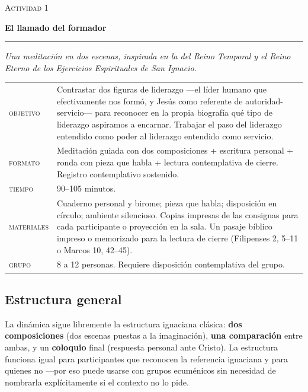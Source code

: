 \documentclass[11pt, a4paper]{article}
\newcommand{\etiqueta}[1]{\textcolor{liderazgoVino}{\scshape #1}}
\newcommand{\tituloActividad}[2]{%
  {\color{tenue}\scshape\normalsize Actividad #1}\par
  \vspace{0.15em}
  {\color{liderazgoVino}\LARGE\bfseries #2}\par
  \vspace{0.3em}
  {\color{regla}\rule{\linewidth}{0.4pt}}\par
  \vspace{0.5em}
}
\begin{document}
\begin{actividad}
\tituloActividad{1}{El llamado del formador}
{\color{tenue}\small\itshape Una meditación en dos escenas, inspirada en la del Reino Temporal y el Reino Eterno de los \emph{Ejercicios Espirituales} de San Ignacio.}

\vspace{0.8em}

\begin{ficha}
\begin{tabular}{@{}p{6em}@{\hspace{1em}}p{\dimexpr\linewidth-7.6em}@{}}
  \etiqueta{objetivo}   & Contrastar dos figuras de liderazgo ---el líder humano que efectivamente nos formó, y Jesús como referente de autoridad-servicio--- para reconocer en la propia biografía qué tipo de liderazgo aspiramos a encarnar. Trabajar el paso del liderazgo entendido como poder al liderazgo entendido como servicio. \\[0.35em]
  \etiqueta{formato}    & Meditación guiada con dos composiciones + escritura personal + ronda con pieza que habla + lectura contemplativa de cierre. Registro contemplativo sostenido. \\[0.35em]
  \etiqueta{tiempo}     & 90--105 minutos. \\[0.35em]
  \etiqueta{materiales} & Cuaderno personal y birome; pieza que habla; disposición en círculo; ambiente silencioso. Copias impresas de las consignas para cada participante o proyección en la sala. Un pasaje bíblico impreso o memorizado para la lectura de cierre (Filipenses 2, 5--11 o Marcos 10, 42--45). \\[0.35em]
  \etiqueta{grupo}      & 8 a 12 personas. Requiere disposición contemplativa del grupo.
\end{tabular}
\end{ficha}

\subsection*{Estructura general}

La dinámica sigue libremente la estructura ignaciana clásica: \textbf{dos composiciones} (dos escenas puestas a la imaginación), \textbf{una comparación} entre ambas, y un \textbf{coloquio} final (respuesta personal ante Cristo). La estructura funciona igual para participantes que reconocen la referencia ignaciana y para quienes no ---por eso puede usarse con grupos ecuménicos sin necesidad de nombrarla explícitamente si el contexto no lo pide.


\end{actividad}
\end{document}

